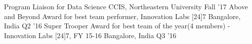 \begin{cvhonors}
    \cvhonor
    {Program Liaison for Data Science}
    {CCIS, Northeastern University}
    {}
    {Fall '17}
  \cvhonor
    {Above and Beyond}
    {Award for best team performer, Innovation Labs [24]7}
    {Bangalore, India}
    {Q2 '16}
  \cvhonor
    {Super Trooper}
    {Award for best team of the year(4 members) - Innovation Labs [24]7, FY 15-16}
    {Bangalore, India}
    {Q3 '16}
\end{cvhonors}